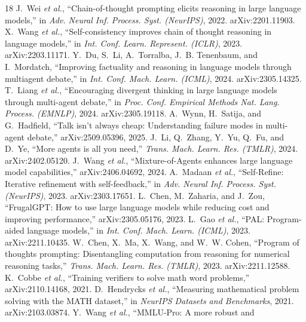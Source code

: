 \documentclass[conference]{IEEEtran}
\begin{document}
\clearpage  %

\begin{thebibliography}{18}
 J.~Wei \emph{et al.}, ``Chain-of-thought prompting elicits
reasoning in large language models,'' in \emph{Adv. Neural Inf. Process. Syst.
(NeurIPS)}, 2022. arXiv:2201.11903.
 X.~Wang \emph{et al.}, ``Self-consistency improves chain of
thought reasoning in language models,'' in \emph{Int. Conf. Learn. Represent. (ICLR)},
2023. arXiv:2203.11171.
 Y.~Du, S.~Li, A.~Torralba, J.~B. Tenenbaum, and I.~Mordatch,
``Improving factuality and reasoning in language models through multiagent debate,''
in \emph{Int. Conf. Mach. Learn. (ICML)}, 2024. arXiv:2305.14325.
 T.~Liang \emph{et al.}, ``Encouraging divergent thinking in
large language models through multi-agent debate,'' in \emph{Proc. Conf. Empirical
Methods Nat. Lang. Process. (EMNLP)}, 2024. arXiv:2305.19118.
 A.~Wynn, H.~Satija, and G.~Hadfield, ``Talk isn't always
cheap: Understanding failure modes in multi-agent debate,'' arXiv:2509.05396, 2025.
 J.~Li, Q.~Zhang, Y.~Yu, Q.~Fu, and D.~Ye, ``More agents is
all you need,'' \emph{Trans. Mach. Learn. Res. (TMLR)}, 2024. arXiv:2402.05120.
 J.~Wang \emph{et al.}, ``Mixture-of-Agents enhances large
language model capabilities,'' arXiv:2406.04692, 2024.
 A.~Madaan \emph{et al.}, ``Self-Refine: Iterative
refinement with self-feedback,'' in \emph{Adv. Neural Inf. Process. Syst. (NeurIPS)},
2023. arXiv:2303.17651.
 L.~Chen, M.~Zaharia, and J.~Zou, ``FrugalGPT: How to use
large language models while reducing cost and improving performance,''
arXiv:2305.05176, 2023.
 L.~Gao \emph{et al.}, ``PAL: Program-aided language models,'' in
\emph{Int. Conf. Mach. Learn. (ICML)}, 2023. arXiv:2211.10435.
 W.~Chen, X.~Ma, X.~Wang, and W.~W. Cohen, ``Program of thoughts
prompting: Disentangling computation from reasoning for numerical reasoning tasks,''
\emph{Trans. Mach. Learn. Res. (TMLR)}, 2023. arXiv:2211.12588.
 K.~Cobbe \emph{et al.}, ``Training verifiers to solve math
word problems,'' arXiv:2110.14168, 2021.
 D.~Hendrycks \emph{et al.}, ``Measuring mathematical
problem solving with the MATH dataset,'' in \emph{NeurIPS Datasets and Benchmarks},
2021. arXiv:2103.03874.
 Y.~Wang \emph{et al.}, ``MMLU-Pro: A more robust and

\end{thebibliography}
\end{document}

